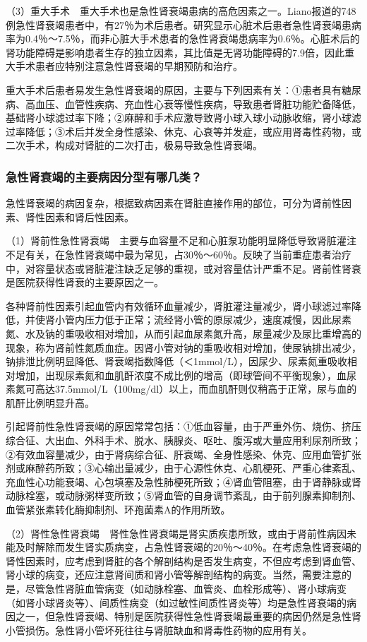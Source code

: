 （3）重大手术　重大手术也是急性肾衰竭患病的高危因素之一。Liano报道的748例急性肾衰竭患者中，有27％为术后患者。研究显示心脏术后患者急性肾衰竭患病率为0.4％～7.5％，而非心脏大手术患者的急性肾衰竭患病率为0.6％。心脏术后的肾功能障碍是影响患者生存的独立因素，其比值是无肾功能障碍的7.9倍，因此重大手术患者应特别注意急性肾衰竭的早期预防和治疗。

重大手术后患者易发生急性肾衰竭的原因，主要与下列因素有关：①患者具有糖尿病、高血压、血管性疾病、充血性心衰等慢性疾病，导致患者肾脏功能贮备降低，基础肾小球滤过率下降；②麻醉和手术应激导致肾小球入球小动脉收缩，肾小球滤过率降低；③术后并发全身性感染、休克、心衰等并发症，或应用肾毒性药物，或二次手术，构成对肾脏的二次打击，极易导致急性肾衰竭。

\subsubsection{急性肾衰竭的主要病因分型有哪几类？}

急性肾衰竭的病因复杂，根据致病因素在肾脏直接作用的部位，可分为肾前性因素、肾性因素和肾后性因素。

（1）肾前性急性肾衰竭　主要与血容量不足和心脏泵功能明显降低导致肾脏灌注不足有关，在急性肾衰竭中最为常见，占30％～60％。反映了当前重症患者治疗中，对容量状态或肾脏灌注缺乏足够的重视，或对容量估计严重不足。肾前性肾衰是医院获得性肾衰的主要原因之一。

各种肾前性因素引起血管内有效循环血量减少，肾脏灌注量减少，肾小球滤过率降低，并使肾小管内压力低于正常；流经肾小管的原尿减少，速度减慢，因此尿素氮、水及钠的重吸收相对增加，从而引起血尿素氮升高，尿量减少及尿比重增高的现象，称为肾前性氮质血症。因肾小管对钠的重吸收相对增加，使尿钠排出减少，钠排泄比例明显降低、肾衰竭指数降低（＜1mmol/L），因尿少、尿素氮重吸收相对增加，出现尿素氮和血肌酐浓度不成比例的增高（即球管间不平衡现象），血尿素氮可高达37.5mmol/L（100mg/dl）以上，而血肌酐则仅稍高于正常，尿与血的肌酐比例明显升高。

引起肾前性急性肾衰竭的原因常常包括：①低血容量，由于严重外伤、烧伤、挤压综合征、大出血、外科手术、脱水、胰腺炎、呕吐、腹泻或大量应用利尿剂所致；②有效血容量减少，由于肾病综合征、肝衰竭、全身性感染、休克、应用血管扩张剂或麻醉药所致；③心输出量减少，由于心源性休克、心肌梗死、严重心律紊乱、充血性心功能衰竭、心包填塞及急性肺梗死所致；④肾血管阻塞，由于肾静脉或肾动脉栓塞，或动脉粥样变所致；⑤肾血管的自身调节紊乱，由于前列腺素抑制剂、血管紧张素转化酶抑制剂、环孢菌素A的作用所致。

（2）肾性急性肾衰竭　肾性急性肾衰竭是肾实质疾患所致，或由于肾前性病因未能及时解除而发生肾实质病变，占急性肾衰竭的20％～40％。在考虑急性肾衰竭的肾性因素时，应考虑到肾脏的各个解剖结构是否发生病变，不但应考虑到肾血管、肾小球的病变，还应注意肾间质和肾小管等解剖结构的病变。当然，需要注意的是，尽管急性肾脏血管病变（如动脉栓塞、血管炎、血栓形成等）、肾小球病变（如肾小球肾炎等）、间质性病变（如过敏性间质性肾炎等）均是急性肾衰竭的病因之一，但急性肾衰竭、特别是医院获得性急性肾衰竭最重要的病因仍然是急性肾小管损伤。急性肾小管坏死往往与肾脏缺血和肾毒性药物的应用有关。

